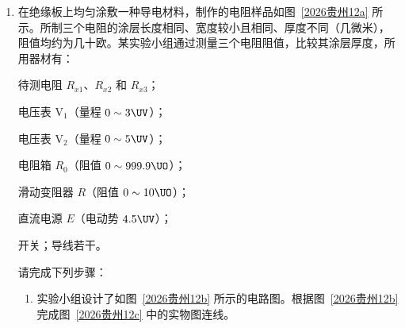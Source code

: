 \documentclass[\gkver]{gaokaozhenti}
\begin{document}
\begin{enumerate}
{\begin{enumerate}
	\item
	摆线长度 $L$，$20$ 次全振动的时间 $t$，周期 $T$

	\item
	$2.02$

	\item
	$\frac{2\pi^{2}(2L+d)}{T^{2}}$

	\item
	大，小

\end{enumerate}
}
\item
在绝缘板上均匀涂敷一种导电材料，制作的电阻样品如图~\ref{2026贵州12a} 所示。所制三个电阻的涂层长度相同、宽度较小且相同、厚度不同（几微米），阻值均约为几十欧。某实验小组通过测量三个电阻阻值，比较其涂层厚度，所用器材有：

待测电阻 $R_{x1}$、$R_{x2}$ 和 $R_{x3}$；

电压表 V$_{1}$（量程 $0\sim3\UV$）；

电压表 V$_{2}$（量程 $0\sim5\UV$）；

电阻箱 $R_{0}$（阻值 $0\sim999.9\UO$）；

滑动变阻器 $R$（阻值 $0\sim10\UO$）；

直流电源 $E$（电动势 $4.5\UV$）；

开关；导线若干。

请完成下列步骤：
\begin{enumerate}
	\item
	实验小组设计了如图~\ref{2026贵州12b} 所示的电路图。根据图~\ref{2026贵州12b} 完成图~\ref{2026贵州12c} 中的实物图连线。


\end{enumerate}
\end{enumerate}
\end{document}
